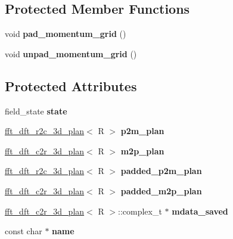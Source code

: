 \subsection*{Protected Member Functions}
\begin{DoxyCompactItemize}
\item 
\hypertarget{classfield_a80741dda39b5efb7243d963bcb95dcca}{
void {\bfseries pad\_\-momentum\_\-grid} ()}
\label{classfield_a80741dda39b5efb7243d963bcb95dcca}

\item 
\hypertarget{classfield_a5a0acbcd951734bcc335b7925d8b69f2}{
void {\bfseries unpad\_\-momentum\_\-grid} ()}
\label{classfield_a5a0acbcd951734bcc335b7925d8b69f2}

\end{DoxyCompactItemize}
\subsection*{Protected Attributes}
\begin{DoxyCompactItemize}
\item 
\hypertarget{classfield_a0339f4775135e5eb7670b51fab6362d7}{
field\_\-state {\bfseries state}}
\label{classfield_a0339f4775135e5eb7670b51fab6362d7}

\item 
\hypertarget{classfield_abf982d33a1c406b4eb1f4c8c467ecf11}{
\hyperlink{classfft__dft__r2c__3d__plan}{fft\_\-dft\_\-r2c\_\-3d\_\-plan}$<$ R $>$ {\bfseries p2m\_\-plan}}
\label{classfield_abf982d33a1c406b4eb1f4c8c467ecf11}

\item 
\hypertarget{classfield_a22253ddf5199719f8d8dcd01247710ca}{
\hyperlink{classfft__dft__c2r__3d__plan}{fft\_\-dft\_\-c2r\_\-3d\_\-plan}$<$ R $>$ {\bfseries m2p\_\-plan}}
\label{classfield_a22253ddf5199719f8d8dcd01247710ca}

\item 
\hypertarget{classfield_a8e03a1aa26e2cf8030907656730da254}{
\hyperlink{classfft__dft__r2c__3d__plan}{fft\_\-dft\_\-r2c\_\-3d\_\-plan}$<$ R $>$ {\bfseries padded\_\-p2m\_\-plan}}
\label{classfield_a8e03a1aa26e2cf8030907656730da254}

\item 
\hypertarget{classfield_ab27e5897e1ad678ad2168862a1c97ca6}{
\hyperlink{classfft__dft__c2r__3d__plan}{fft\_\-dft\_\-c2r\_\-3d\_\-plan}$<$ R $>$ {\bfseries padded\_\-m2p\_\-plan}}
\label{classfield_ab27e5897e1ad678ad2168862a1c97ca6}

\item 
\hypertarget{classfield_a36ec9091d81140d37552b1d6ef673e8c}{
\hyperlink{classfft__dft__c2r__3d__plan}{fft\_\-dft\_\-c2r\_\-3d\_\-plan}$<$ R $>$::complex\_\-t $\ast$ {\bfseries mdata\_\-saved}}
\label{classfield_a36ec9091d81140d37552b1d6ef673e8c}

\item 
\hypertarget{classfield_a0a82ffffc6d875d5b333d48a80787cdd}{
const char $\ast$ {\bfseries name}}
\label{classfield_a0a82ffffc6d875d5b333d48a80787cdd}

\end{DoxyCompactItemize}


